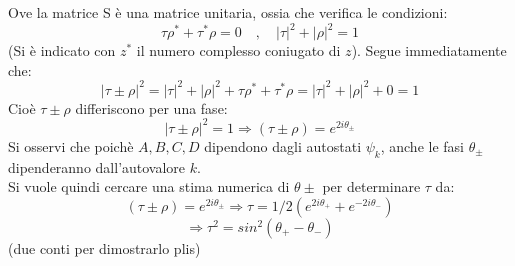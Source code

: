 Ove la matrice S è una matrice unitaria, ossia che verifica le condizioni:
$$ \tau\rho^* + \tau^*\rho = 0 \quad,\quad |\tau|^2 + |\rho|^2 = 1$$
(Si è indicato con $z^*$ il numero complesso coniugato di $z$). Segue immediatamente che:
$$ |\tau \pm \rho|^2 = |\tau|^2 + |\rho|^2 + \tau\rho^* + \tau^*\rho = |\tau|^2 + |\rho|^2 + 0 = 1$$
Cioè $\tau \pm \rho$ differiscono per una fase:
$$ |\tau \pm \rho|^2 = 1 \Rightarrow (\tau \pm \rho) = e^{2i\theta_\pm}$$
Si osservi che poichè $A,B,C,D$ dipendono dagli autostati $\psi_k$, anche le fasi $\theta_\pm$ dipenderanno dall'autovalore $k$.\\
Si vuole quindi cercare una stima numerica di $\theta\pm$ per determinare $\tau$ da:
    $$ (\tau \pm \rho) = e^{2i\theta_\pm} \Rightarrow \tau = 1/2(e^{2i\theta_+}+e^{-2i\theta_-})$$
    $$ \Rightarrow \tau^2 = sin^2(\theta_+ - \theta_-)$$
(due conti per dimostrarlo plis)
